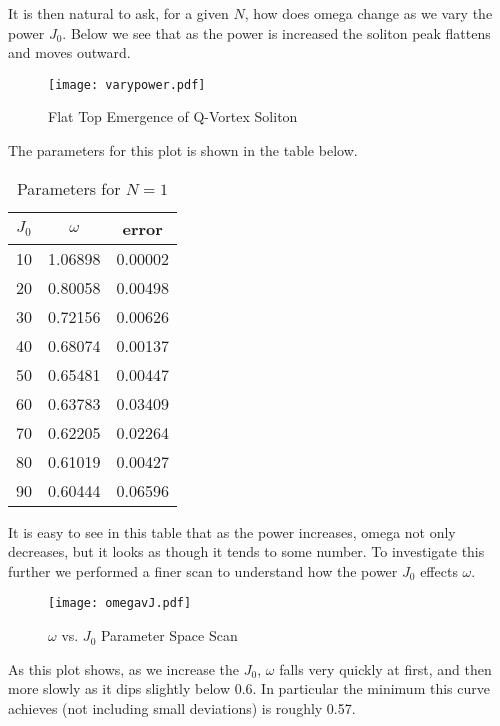 It is then natural to ask, for a given \(N\), how does omega change as we vary
the power \(J_0\). Below we see that as the power is increased the soliton peak
flattens and moves outward.
\begin{figure}[H]
    \centering
    \texttt{[image: varypower.pdf]}
    \caption{Flat Top Emergence of Q-Vortex Soliton}\label{fig:flattops}
\end{figure}
The parameters for this plot is shown in the table below.
\begin{table}[H]
    \centering
    \begin{tabular}{c c c}              \toprule
        \(J_0\) & \(\omega\) & error   \\ \midrule
        10      & 1.06898    & 0.00002 \\ \midrule
        20      & 0.80058    & 0.00498 \\ \midrule
        30      & 0.72156    & 0.00626 \\ \midrule
        40      & 0.68074    & 0.00137 \\ \midrule
        50      & 0.65481    & 0.00447 \\ \midrule
        60      & 0.63783    & 0.03409 \\ \midrule
        70      & 0.62205    & 0.02264 \\ \midrule
        80      & 0.61019    & 0.00427 \\ \midrule
        90      & 0.60444    & 0.06596 \\ \bottomrule
    \end{tabular}
    \caption{Parameters for \(N = 1\)}\label{tab:paramsN}
\end{table}
It is easy to see in this table that as the power increases, omega not only
decreases, but it looks as though it tends to some number. To investigate this
further we performed a finer scan to understand how the power \(J_0\) effects
\(\omega\).
\begin{figure}[H]
    \centering
    \texttt{[image: omegavJ.pdf]}
    \caption{\(\omega\) vs. \(J_0\) Parameter Space Scan}\label{fig:paramspace}
\end{figure}
As this plot shows, as we increase the \(J_0\), \(\omega\) falls very quickly at
first, and then more slowly as it dips slightly below 0.6. In particular the
minimum this curve achieves (not including small deviations) is roughly 0.57.





